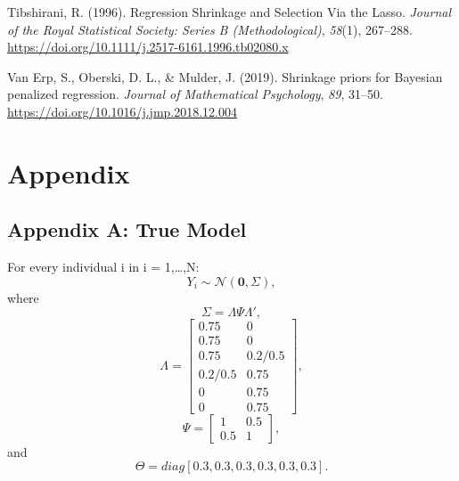 \documentclass[
  man,floatsintext]{apa6}
\newlength{\cslhangindent}
\newlength{\cslentryspacingunit} %
\newenvironment{CSLReferences}[2] %
 {%
  \setlength{\parindent}{0pt}
  \ifodd #1
  \let\oldpar\par
  \def\par{\hangindent=\cslhangindent\oldpar}
  \fi
  \setlength{\parskip}{#2\cslentryspacingunit}
 }%
 {}
\begin{document}
\begin{CSLReferences}{1}{0}
\leavevmode{}%
Tibshirani, R. (1996). Regression {Shrinkage} and {Selection} {Via} the {Lasso}. \emph{Journal of the Royal Statistical Society: Series B (Methodological)}, \emph{58}(1), 267--288. \url{https://doi.org/10.1111/j.2517-6161.1996.tb02080.x}

\leavevmode{}%
Van Erp, S., Oberski, D. L., \& Mulder, J. (2019). Shrinkage priors for {Bayesian} penalized regression. \emph{Journal of Mathematical Psychology}, \emph{89}, 31--50. \url{https://doi.org/10.1016/j.jmp.2018.12.004}

\end{CSLReferences}

\endgroup

\clearpage

\hypertarget{appendix}{%
\section{Appendix}\label{appendix}}

\hypertarget{appendix-a-true-model}{%
\subsection{Appendix A: True Model}\label{appendix-a-true-model}}

For every individual i in i = 1,\ldots,N:
\[Y_i \sim \mathcal{N}(\mathbf{0}, \Sigma),\] where
\[\Sigma = \Lambda\Psi\Lambda',\]
\[\Lambda = 
    \begin{bmatrix}
    0.75 & 0 \\
    0.75 & 0 \\
    0.75 & 0.2/0.5 \\
    0.2/0.5 & 0.75 \\
    0 & 0.75 \\
    0 & 0.75
    \end{bmatrix},\]
\[\Psi =
    \begin{bmatrix}
     1 & 0.5 \\
     0.5 & 1
    \end{bmatrix}
,\] and
\[\Theta = diag[0.3, 0.3, 0.3, 0.3, 0.3, 0.3].\]
\end{document}
